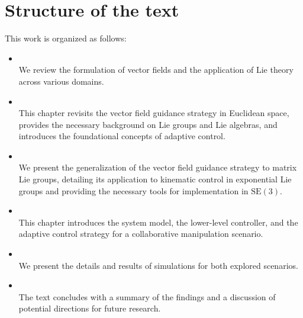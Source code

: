 \section{Structure of the text}
This work is organized as follows:
\begin{itemize}
    \item {}\\
    We review the formulation of vector fields and the application of Lie theory across various domains.
    \item {}\\
    This chapter revisits the vector field guidance strategy in Euclidean space, provides the necessary background on Lie groups and Lie algebras, and introduces the foundational concepts of adaptive control.
    \item {}\\
    We present the generalization of the vector field guidance strategy to matrix Lie groups, detailing its application to kinematic control in exponential Lie groups and providing the necessary tools for implementation in $\text{SE}(3)$.
    \item {}\\
    This chapter introduces the system model, the lower-level controller, and the adaptive control strategy for a collaborative manipulation scenario.
    \item {}\\
    We present the details and results of simulations for both explored scenarios.
    \item {}\\
    The text concludes with a summary of the findings and a discussion of potential directions for future research.
\end{itemize}

